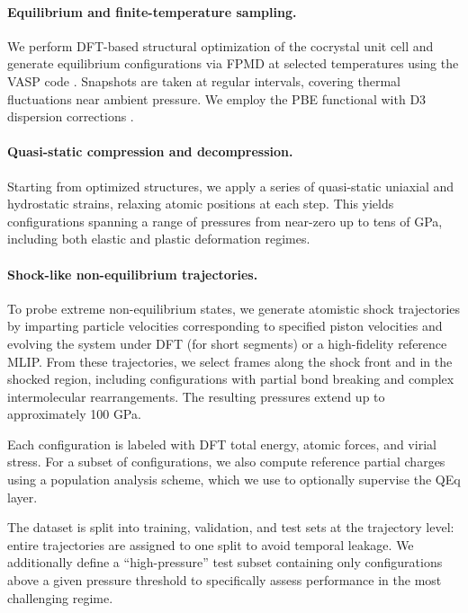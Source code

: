\documentclass{article}
\begin{document}
\paragraph{Equilibrium and finite-temperature sampling.}
We perform DFT-based structural optimization of the cocrystal unit cell and generate equilibrium configurations via FPMD at selected temperatures using the VASP code \cite{kresse1996efficient}. Snapshots are taken at regular intervals, covering thermal fluctuations near ambient pressure. We employ the PBE functional \cite{perdew1996generalized} with D3 dispersion corrections \cite{grimme2010consistent}.

\paragraph{Quasi-static compression and decompression.}
Starting from optimized structures, we apply a series of quasi-static uniaxial and hydrostatic strains, relaxing atomic positions at each step. This yields configurations spanning a range of pressures from near-zero up to tens of GPa, including both elastic and plastic deformation regimes.

\paragraph{Shock-like non-equilibrium trajectories.}
To probe extreme non-equilibrium states, we generate atomistic shock trajectories by imparting particle velocities corresponding to specified piston velocities and evolving the system under DFT (for short segments) or a high-fidelity reference MLIP. From these trajectories, we select frames along the shock front and in the shocked region, including configurations with partial bond breaking and complex intermolecular rearrangements. The resulting pressures extend up to approximately 100 GPa.

Each configuration is labeled with DFT total energy, atomic forces, and virial stress. For a subset of configurations, we also compute reference partial charges using a population analysis scheme, which we use to optionally supervise the QEq layer.

The dataset is split into training, validation, and test sets at the trajectory level: entire trajectories are assigned to one split to avoid temporal leakage. We additionally define a ``high-pressure'' test subset containing only configurations above a given pressure threshold to specifically assess performance in the most challenging regime.
\end{document}
